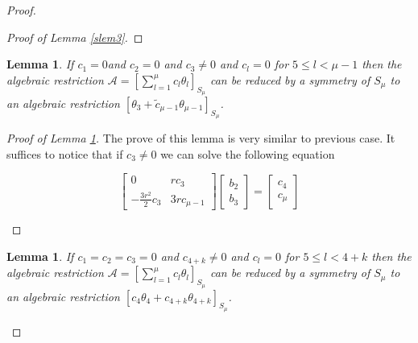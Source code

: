 \documentclass{amsart}
\newtheorem{lem}[thm]{Lemma}
\theoremstyle{definition}
\numberwithin{equation}{section}
\begin{document}
\begin{proof}
\begin{proof}[Proof of Lemma \ref{slem3}]
 \end{proof}

 \begin{lem}
\label{slem3a} If \;$c_1= 0$\;and $c_2 = 0$ and $c_3\ne 0$ and $c_l=0$ for $5\leq l< \mu-1$  then the algebraic restriction $\mathcal{A}=[ \sum_{l=1}^{\mu}c_{l} \theta_{l}]_{S_{\mu}}$ can be reduced by a symmetry of $S_{\mu}$ to an algebraic restriction $[\theta_3+ \widetilde{c}_{\mu-1} \theta_{\mu-1}]_{S_{\mu}}$.
\end{lem}

\begin{proof}[Proof of Lemma \ref{slem3a}]

The prove of this lemma is very similar to previous case. It suffices to notice that if $c_3\ne 0$ we can solve the following equation
\setlength{\arraycolsep}{1mm}
\begin{small}
\begin{equation}  \label{proofslem33a}
\left[ \begin{array}{cc}
 0 & rc_3  \\
 -\frac{3r^2}{2}c_3 & 3rc_{\mu-1}
\end{array} \right]
\left[ \begin{array}{c}  b_2 \\ b_3   \end{array} \right] =
\left[ \begin{array}{c} c_4  \\  c_{\mu}  \end{array}  \right]
\end{equation}
\end{small}
\end{proof}

\begin{lem}
\label{slem4} If \;$c_1=c_2=c_3= 0$\; and $c_{4+k} \ne 0$ and $c_l=0$ for $5\leq l< 4+k$  then the algebraic restriction $\mathcal{A}=[ \sum_{l=1}^{\mu}c_{l} \theta_{l}]_{S_{\mu}}$ can be reduced by a symmetry of $S_{\mu}$ to an algebraic restriction $[c_4\theta_4+ c_{4+k} \theta_{4+k}]_{S_{\mu}}$.
\end{lem}


\end{proof}
\end{document}
